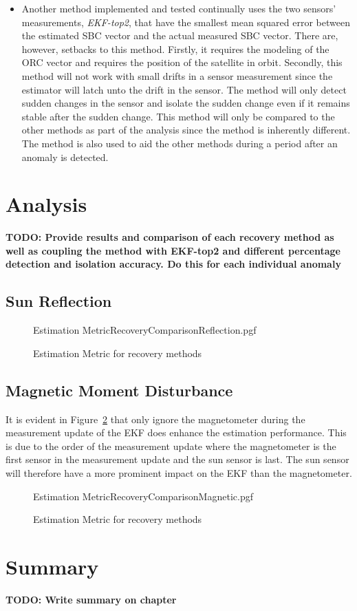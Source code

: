 \begin{itemize}
	\item Another method implemented and tested continually uses the two sensors' measurements, \emph{EKF-top2}, that have the smallest mean squared error between the estimated SBC vector and the actual measured SBC vector. There are, however, setbacks to this method. Firstly, it requires the modeling of the ORC vector and requires the position of the satellite in orbit. Secondly, this method will not work with small drifts in a sensor measurement since the estimator will latch unto the drift in the sensor. The method will only detect sudden changes in the sensor and isolate the sudden change even if it remains stable after the sudden change. This method will only be compared to the other methods as part of the analysis since the method is inherently different. The method is also used to aid the other methods during a period after an anomaly is detected.
\end{itemize}

\section{Analysis}
\textbf{TODO: Provide results and comparison of each recovery method as well as coupling the method with EKF-top2 and different percentage detection and isolation accuracy. Do this for each individual anomaly}

\subsection{Sun Reflection}

\begin{figure}[!htb]
	\centering
	\def\pgfwidth{7cm}
	{Estimation MetricRecoveryComparisonReflection.pgf}
	
	\caption{Estimation Metric for recovery methods}
	\label{fig:RecoveryComparisonReflection}
\end{figure}

\subsection{Magnetic Moment Disturbance}
It is evident in Figure~\ref{fig:RecoveryComparisonMagnetic} that only ignore the magnetometer during the measurement update of the EKF does enhance the estimation performance. This is due to the order of the measurement update where the magnetometer is the first sensor in the measurement update and the sun sensor is last. The sun sensor will therefore have a more prominent impact on the EKF than the magnetometer.
\begin{figure}[!htb]
	\centering
	\def\pgfwidth{7cm}
	{Estimation MetricRecoveryComparisonMagnetic.pgf}
	
	\caption{Estimation Metric for recovery methods}
	\label{fig:RecoveryComparisonMagnetic}
\end{figure}

\section{Summary}
\textbf{TODO: Write summary on chapter}
